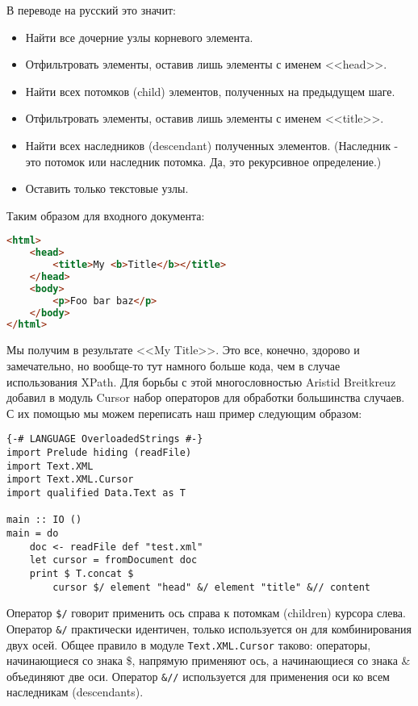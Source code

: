 В переводе на русский это значит:

\begin{itemize}
\item Найти все дочерние узлы корневого элемента.
\item Отфильтровать элементы, оставив лишь элементы с именем <<head>>.
\item Найти всех потомков (child) элементов, полученных на предыдущем шаге.
\item Отфильтровать элементы, оставив лишь элементы с именем <<title>>.
\item Найти всех наследников (descendant) полученных элементов. (Наследник - это потомок или наследник потомка. Да, это рекурсивное определение.)
\item Оставить только текстовые узлы.
\end{itemize}

Таким образом для входного документа:

\begin{lstlisting}[language=HTML]
<html>
    <head>
        <title>My <b>Title</b></title>
    </head>
    <body>
        <p>Foo bar baz</p>
    </body>
</html>
\end{lstlisting}

Мы получим в результате <<My Title>>. Это все, конечно, здорово и замечательно, но вообще-то тут намного больше кода, чем в случае использования XPath. Для борьбы с этой многословностью Aristid Breitkreuz добавил в модуль Cursor набор операторов для обработки большинства случаев. С их помощью мы можем переписать наш пример следующим образом:

\begin{lstlisting}
{-# LANGUAGE OverloadedStrings #-}
import Prelude hiding (readFile)
import Text.XML
import Text.XML.Cursor
import qualified Data.Text as T

main :: IO ()
main = do
    doc <- readFile def "test.xml"
    let cursor = fromDocument doc
    print $ T.concat $
        cursor $/ element "head" &/ element "title" &// content
\end{lstlisting}%

Оператор \lstinline!$/! говорит применить ось справа к потомкам (children) курсора слева. Оператор \lstinline!&/! практически идентичен, только используется он для комбинирования двух осей. Общее правило в модуле \lstinline!Text.XML.Cursor! таково: операторы, начинающиеся со знака \$, напрямую применяют ось, а начинающиеся со знака \& объединяют две оси. Оператор \lstinline!&//! используется для применения оси ко всем наследникам (descendants).


